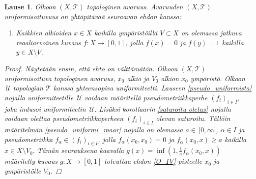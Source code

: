 \documentclass[12pt,a4paper,leqno]{report}
\newcommand{\U}{\,\mathcal{U}}
\newcommand{\T}{\mathcal{T}}
\theoremstyle{plain}
\newtheorem{lause}[equation]{Lause}
\theoremstyle{definition}
\theoremstyle{remark}
\begin{document}
\begin{lause}\label{unizable}
Olkoon $(X,\T)$ topologinen avaruus.
Avaruuden $(X,\T)$ uniformisoituvuus on yhtäpitävää seuraavan ehdon kanssa:
\begin{enumerate} [label=(Z),ref=(Z)]
\item\label{O_IV} Kaikkien alkioiden $x\in X$ kaikilla 
ympäristöillä $V\subset X$ on olemassa jatkuva 
reaaliarvoinen kuvaus $f\colon X\rightarrow [0,1]$, 
jolla $f(x)=0$ ja $f(y)=1$ kaikilla $y\in X\setminus V$.
\end{enumerate}
\begin{proof}
Näytetään ensin, että ehto on välttämätön. 
Olkoon $(X,\T)$ uniformisoituva topologinen avaruus, $x_0$ alkio ja $V_0$ alkion $x_0$ ympäristö. Olkoon $\U$ topologian $\T$ kanssa yhteensopiva uniformiteetti. 
Lauseen \ref{pseudo_uniformista} nojalla uniformiteetille $\U$ voidaan 
määritellä pseudometriikkaperhe $(f_i)_{i\in I}$, joka indusoi uniformiteetin $\U$. 
Lisäksi korollaarin \ref{saturoitu oletus} nojalla voidaan olettaa 
pseudometriikkaperheen $(f_i)_{i\in I}$ olevan saturoitu. 
Tällöin määritelmän \ref{pseudo_uniformi_maar} nojalla on olemassa $ a\in\,]0,\infty]$, $\alpha\in I$ 
ja pseudometriikka $f_\alpha\in (f_i)_{i\in I}$, 
jolla $f_\alpha(x_0,x_0)=0$ ja $f_\alpha (x_0,x)\geq a$ kaikilla $x\in X\setminus V_0$. 
Tämän seurauksena kaavalla $g(x)=\inf \left( 1,\frac{1}{a}f_\alpha(x_0,x) \right)$ määritelty kuvaus $g\colon X\to [0,1]$ 
toteuttaa ehdon \ref{O_IV} pisteelle $x_0$ ja ympäristölle $V_0$.


\end{proof}
\end{lause}
\end{document}
